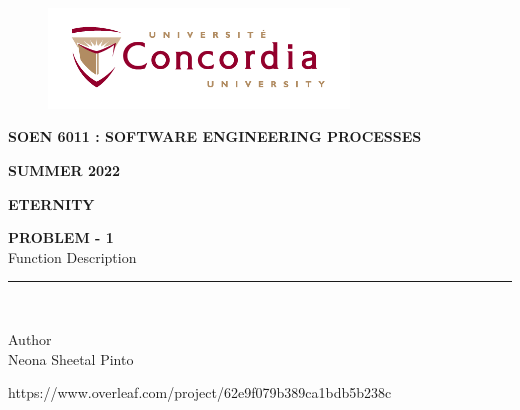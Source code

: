 \documentclass[letterpaper, 11pt]{article}
\begin{document}
\begin{titlepage}
\vspace*{0.7in}
\begin{center}
\begin{figure}[htb]
\begin{center}
\includegraphics[width=8cm]{univ_logo}
\end{center}
\end{figure}
\vspace*{0.3in}
\begin{Large}
\textbf{SOEN 6011 : SOFTWARE ENGINEERING PROCESSES} \\
\end{Large}
\vspace*{0.1in}
\begin{Large}
\textbf{SUMMER 2022} \\
\end{Large}
\vspace*{0.9in}
\begin{Large}
\textbf{ETERNITY} \\
\end{Large}
\vspace*{0.625in}
\begin{Large} 

\textbf{PROBLEM - 1} \\
\vspace*{0.2in}
Function Description\\
\vspace*{0.1in}
\end{Large}
\vspace*{0.625in}
\rule{80mm}{0.1mm}\\
\vspace*{0.1in}
\begin{large}
Author \\
\vspace*{0.1in}
Neona Sheetal Pinto\\
\vspace*{1.0in}
\date{\normalsize\today} 
\end{large}
\end{center}
\begin{center}
https://www.overleaf.com/project/62e9f079b389ca1bdb5b238c\end{center}

\end{titlepage}
\end{document}
